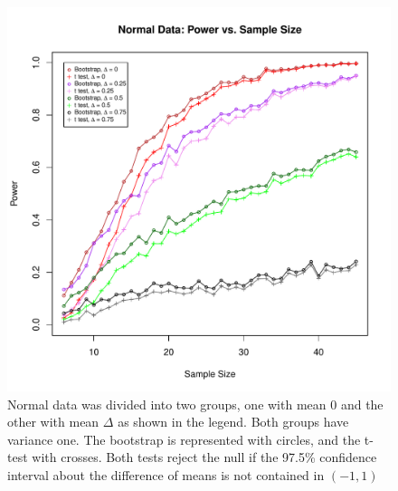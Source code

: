 \begin{figure}[h!]
\includegraphics{NormalPowerEpsilon.pdf}
\caption{Normal data was divided into two groups, one with mean $0$ and the other with mean $\Delta$ as shown in the legend. Both groups have variance one. The bootstrap is represented with circles, and the t-test with crosses. Both tests reject the null if the 97.5\% confidence interval about the difference of means is not contained in $(-1,1)$}
\label{NormalPowerEpsilon}
\end{figure}

\pagebreak

